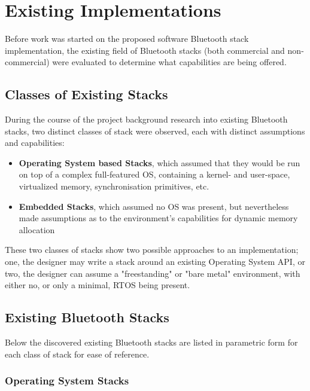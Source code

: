 \chapter{Existing Implementations}
\label{chp:existingimp}

Before work was started on the proposed software Bluetooth stack implementation, the existing field of Bluetooth stacks (both commercial and non-commercial) were evaluated to determine what capabilities are being offered.

\section{Classes of Existing Stacks}

During the course of the project background research into existing Bluetooth stacks, two distinct classes of stack were observed, each with distinct assumptions and capabilities:

\begin{itemize}
	\item \textbf{Operating System based Stacks}, which assumed that they would be run on top of a complex full-featured OS, containing a kernel- and user-space, virtualized memory, synchronisation primitives, etc.
	\item \textbf{Embedded Stacks}, which assumed no OS was present, but nevertheless made assumptions as to the environment's capabilities for dynamic memory allocation
\end{itemize}

These two classes of stacks show two possible approaches to an implementation; one, the designer may write a stack around an existing Operating System API, or two, the designer can assume a "freestanding" or "bare metal" environment, with either no, or only a minimal, RTOS being present.

\section{Existing Bluetooth Stacks}

Below the discovered existing Bluetooth stacks are listed in parametric form for each class of stack for ease of reference.

\subsection{Operating System Stacks}

